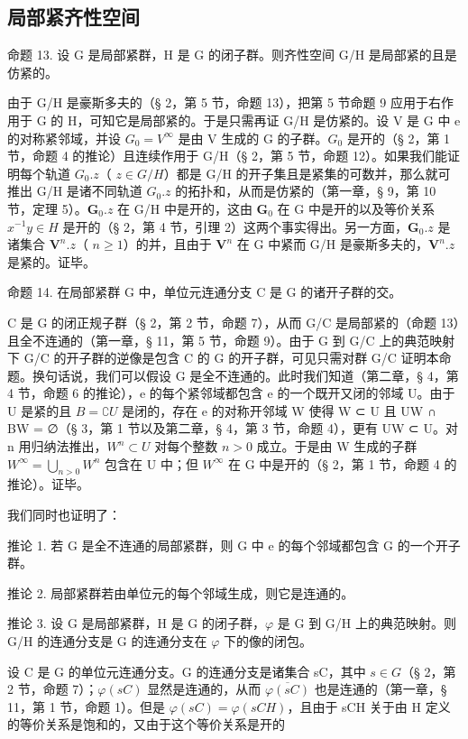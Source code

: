 \subsection{局部紧齐性空间}

命题 13. 设 G 是局部紧群，H 是 G 的闭子群。则齐性空间 G/H 是局部紧的且是仿紧的。

由于 G/H 是豪斯多夫的（§ 2，第 5 节，命题 13），把第 5 节命题 9 应用于右作用于 G 的 H，可知它是局部紧的。于是只需再证 G/H 是仿紧的。设 V 是 G 中 e 的对称紧邻域，并设 \(G_{0}=V^{\infty}\) 是由 V 生成的 G 的子群。\(G_{0}\) 是开的（§ 2，第 1 节，命题 4 的推论）且连续作用于 G/H（§ 2，第 5 节，命题 12）。如果我们能证明每个轨道 \(G_{0}.z\)（ \(z\in G/H\)）都是 G/H 的开子集且是紧集的可数并，那么就可推出 G/H 是诸不同轨道 \(G_{0}.z\) 的拓扑和，从而是仿紧的（第一章，§ 9，第 10 节，定理 5）。\(\mathbf{G}_0.z\) 在 G/H 中是开的，这由 \(\mathbf{G}_0\) 在 G 中是开的以及等价关系 \(x^{-1}y\in H\) 是开的（§ 2，第 4 节，引理 2）这两个事实得出。另一方面，\(\mathbf{G}_0.z\) 是诸集合 \(\mathbf{V}^n.z\)（ \(n\geqslant 1\)）的并，且由于 \(\mathbf{V}^n\) 在 G 中紧而 G/H 是豪斯多夫的，\(\mathbf{V}^n.z\) 是紧的。证毕。

命题 14. 在局部紧群 G 中，单位元连通分支 C 是 G 的诸开子群的交。

C 是 G 的闭正规子群（§ 2，第 2 节，命题 7），从而 G/C 是局部紧的（命题 13）且全不连通的（第一章，§ 11，第 5 节，命题 9）。由于 G 到 G/C 上的典范映射下 G/C 的开子群的逆像是包含 C 的 G 的开子群，可见只需对群 G/C 证明本命题。换句话说，我们可以假设 G 是全不连通的。此时我们知道（第二章，§ 4，第 4 节，命题 6 的推论），e 的每个紧邻域都包含 e 的一个既开又闭的邻域 U。由于 U 是紧的且 \(B = \complement U\) 是闭的，存在 e 的对称开邻域 W 使得 W ⊂ U 且 UW ∩ BW = ∅（§ 3，第 1 节以及第二章，§ 4，第 3 节，命题 4），更有 UW ⊂ U。对 n 用归纳法推出，\(W^n \subset U\) 对每个整数 \(n > 0\) 成立。于是由 W 生成的子群 \(W^\infty = \bigcup_{n > 0} W^n\) 包含在 U 中；但 \(W^\infty\) 在 G 中是开的（§ 2，第 1 节，命题 4 的推论）。证毕。

我们同时也证明了：

推论 1. 若 G 是全不连通的局部紧群，则 G 中 e 的每个邻域都包含 G 的一个开子群。

推论 2. 局部紧群若由单位元的每个邻域生成，则它是连通的。

推论 3. 设 G 是局部紧群，H 是 G 的闭子群，\(\varphi\) 是 G 到 G/H 上的典范映射。则 G/H 的连通分支是 G 的连通分支在 \(\varphi\) 下的像的闭包。

设 C 是 G 的单位元连通分支。G 的连通分支是诸集合 sC，其中 \(s \in G\)（§ 2，第 2 节，命题 7）；\(\varphi(sC)\) 显然是连通的，从而 \(\overline{\varphi(sC)}\) 也是连通的（第一章，§ 11，第 1 节，命题 1）。但是 \(\varphi(sC) = \varphi(sCH)\)，且由于 sCH 关于由 H 定义的等价关系是饱和的，又由于这个等价关系是开的

